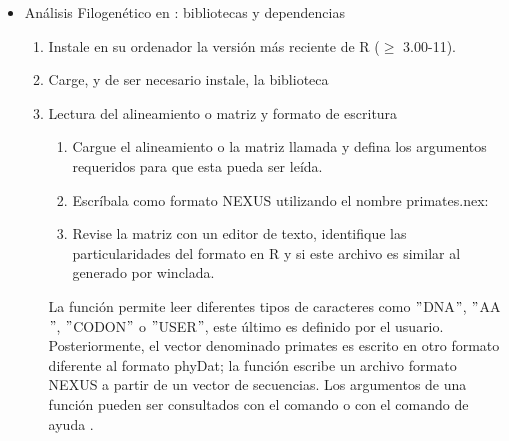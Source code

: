 \begin{itemize}
  
\item An\'alisis Filogen\'etico en : bibliotecas y dependencias

\begin{enumerate}
  \item Instale en su ordenador la versi\'on m\'as reciente de R ($\ge$ 3.00-11). 
  \item Carge, y de ser necesario instale,  la biblioteca 

  \item{Lectura del alineamiento o matriz y formato de escritura}
  \begin{enumerate}
    \item   Cargue el alineamiento o la matriz llamada   y defina los argumentos requeridos para que esta pueda ser le\'ida. 
    \item Escr\'ibala como formato NEXUS utilizando el nombre primates.nex:
    \item Revise la matriz  con un editor de texto,  identifique las particularidades del formato en R y si este archivo es similar al generado por winclada.
  \end{enumerate}


La funci\'on  permite leer diferentes tipos de caracteres como $"$DNA$"$,  $"$AA$"$,  $"$CODON$"$ o $"$USER$"$, este \'ultimo es definido por el usuario. Posteriormente, el vector denominado primates es escrito en otro formato diferente al formato phyDat; la funci\'on  escribe un archivo formato NEXUS a partir de un vector de secuencias. Los argumentos de una funci\'on pueden ser consultados con el comando  o con el comando de ayuda .




\end{enumerate}
\end{itemize}
